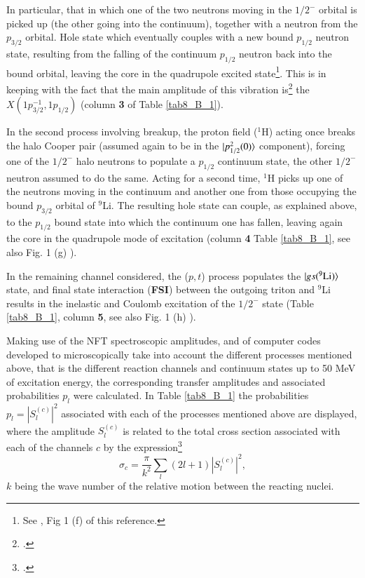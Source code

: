  
 In particular, that in which one of the two neutrons moving in the $1/2^-$ orbital is picked up (the other going into the continuum), together with a neutron from the $p_{3/2}$ orbital. Hole state which eventually  couples with a new bound $p_{1/2}$ neutron state, resulting from the falling of the continuum $p_{1/2}$ neutron back into the bound orbital, leaving the core in the quadrupole excited state\footnote{See  \cite{Potel:10}, Fig 1 (f) of this reference.}. This is in keeping with the fact that the main amplitude of this vibration is\footnote{\cite{Barranco:01}.} the  $X(1p^{-1}_{3/2},1p_{1/2})$ (column \textbf{3} of Table \ref{tab8_B_1}).


 In the second process involving breakup, the proton field ($^1$H) acting once breaks the halo Cooper pair (assumed again to be in the $|{p_{1/2}^2(0)} \rangle$ component), forcing one of the $1/2^-$ halo neutrons to populate a $p_{1/2}$ continuum state, the other $1/2^-$ neutron assumed to do the same. Acting for a second time, $^1$H picks up one of the neutrons moving in the continuum and another one from those occupying the bound $p_{3/2}$ orbital of $^{9}$Li.  The resulting hole state can couple,  as explained above,  to the $p_{1/2}$ bound state into which the continuum one has fallen, leaving again the core in the quadrupole mode of excitation (column \textbf{4} Table \ref{tab8_B_1}, see also Fig. 1 (g) \cite{Potel:10}). 
 
  In the remaining channel considered, the ($p,t$) process populates the  $|{gs(^{9}\text{Li})} \rangle$ state, and final state interaction (\textbf{FSI}) between the outgoing triton and $^{9}$Li results in the inelastic and Coulomb excitation of  the $1/2^-$ state (Table \ref{tab8_B_1}, column \textbf{5}, see also Fig. 1 (h) \cite{Potel:10}).
 
 
 Making use of the NFT spectroscopic amplitudes, and of computer codes developed  to microscopically take into account the different processes mentioned above, that is the different reaction channels and continuum states up to 50 MeV of excitation energy, the corresponding transfer amplitudes and associated probabilities $p_l$ were calculated.
 In Table \ref{tab8_B_1}  the probabilities $p_l=|S_l^{(c)}|^2$ associated with each of the processes mentioned above are displayed, where the amplitude $S_l^{(c)}$ is related to the total cross section associated with each of the channels $c$  by the expression\footnote{\cite{Satchler:80,Landau:81}.}
 \begin{equation}\label{eq6B1}
 \sigma_c=\frac{\pi}{k^2}\sum_l(2l+1)|S_l^{(c)}|^2,
 \end{equation}
 $k$ being the wave number of the relative motion between the reacting nuclei.
 
